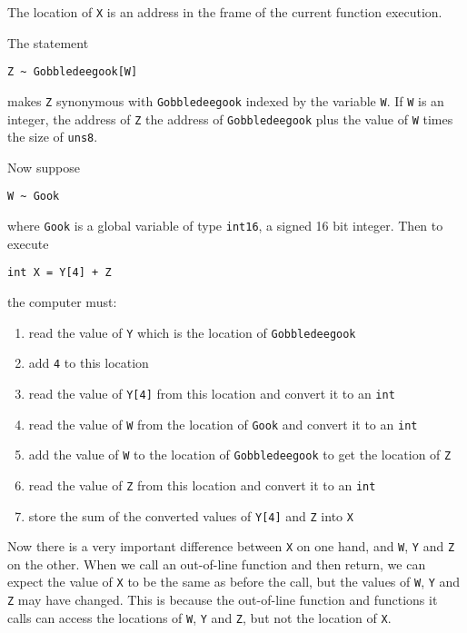 \documentclass[12pt]{article}
\newcommand{\TILDE}{\textasciitilde}
\begin{document}
The location of {\tt X} is an address in
the frame of the current function execution.

The statement
\begin{center}
\tt Z \TILDE{} Gobbledeegook[W]
\end{center}
makes {\tt Z} synonymous with {\tt Gobbledeegook}
indexed by the variable {\tt W}.  If {\tt W} is an
integer, the address of {\tt Z} the address
of {\tt Gobbledeegook} plus the value of {\tt W}
times the size of {\tt uns8}.

Now suppose
\begin{center}
\tt W \TILDE{} Gook
\end{center}
where {\tt Gook} is a global variable of type {\tt int16},
a signed 16 bit integer.  Then to execute
\begin{center}
\tt int X = Y[4] + Z
\end{center}
the computer must:
\begin{enumerate}
\item read the value of {\tt Y} which is the location of {\tt Gobbledeegook}
\item add {\tt 4} to this location
\item read the value of {\tt Y[4]} from this location and convert it
      to an {\tt int}
\item read the value of {\tt W} from the location of {\tt Gook} and
      convert it to an {\tt int}
\item add the value of {\tt W} to the location of {\tt Gobbledeegook}
      to get the location of {\tt Z}
\item read the value of {\tt Z} from this location and convert
      it to an {\tt int}
\item store the sum of the converted values of {\tt Y[4]} and {\tt Z} into {\tt X}
\end{enumerate}

Now there is a very important difference between {\tt X} on one
hand, and {\tt W}, {\tt Y} and {\tt Z} on the other.  When we call an
out-of-line function and then return, we can expect the value of
{\tt X} to be the same as before the call, but the values of
{\tt W}, {\tt Y} and {\tt Z} may have changed.  This is because the out-of-line
function and functions it calls can access the locations of {\tt W}, {\tt Y}
and {\tt Z}, but not the location of {\tt X}.
\end{document}
